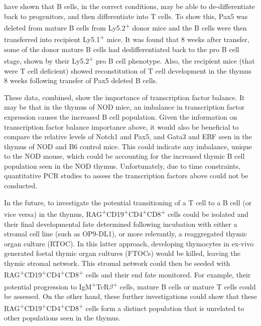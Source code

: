 \citet{Cobaleda2007} have shown that B cells, in the correct conditions, may be able to de-differentiate back to progenitors, and then differentiate into T cells.
To show this, Pax5 was deleted from mature B cells from Ly5.2\textsuperscript{+} donor mice and the B cells were then transferred into recipient Ly5.1\textsuperscript{+} mice.
It was found that 8 weeks after transfer, some of the donor mature B cells had dedifferentiated back to the pro B cell stage, shown by their Ly5.2\textsuperscript{+} pro B cell phenotype.
Also, the recipient mice (that were T cell deficient) showed reconstitution of T cell development in the thymus 8 weeks following transfer of Pax5 deleted B cells.

These data, combined, show the importance of transcription factor balance.
It may be that in the thymus of NOD mice, an imbalance in transcription factor expression causes the increased B cell population.
Given the information on transcription factor balance importance above, it would also be beneficial to compare the relative levels of Notch1 and Pax5, and Gata3 and EBF seen in the thymus of NOD and B6 control mice.
This could indicate any imbalance, unique to the NOD mouse, which could be accounting for the increased thymic B cell population seen in the NOD thymus.
Unfortunately, due to time constraints, quantitative PCR studies to assess the transcription factors above could not be conducted.


In the future, to investigate the potential transitioning of a T cell to a B cell (or vice versa) in the thymus, RAG\textsuperscript{+}CD19\textsuperscript{+}CD4\textsuperscript{+}CD8\textsuperscript{+} cells could be isolated and their final developmental fate determined following incubation with either a stromal cell line (such as OP9-DL1), or more relevantly, a reaggregated thymic organ culture (RTOC).
In this latter approach, developing thymocytes in ex-vivo generated foetal thymic organ cultures (FTOCs) would be killed, leaving the thymic stromal network.
This stromal network could then be seeded with RAG\textsuperscript{+}CD19\textsuperscript{+}CD4\textsuperscript{+}CD8\textsuperscript{+} cells and their end fate monitored.
For example, their potential progression to IgM\textsuperscript{+}TcR$\beta$\textsuperscript{+} cells, mature B cells or mature T cells could be assessed.
On the other hand, these further investigations could show that these RAG\textsuperscript{+}CD19\textsuperscript{+}CD4\textsuperscript{+}CD8\textsuperscript{+} cells form a distinct population that is unrelated to other populations seen in the thymus.

